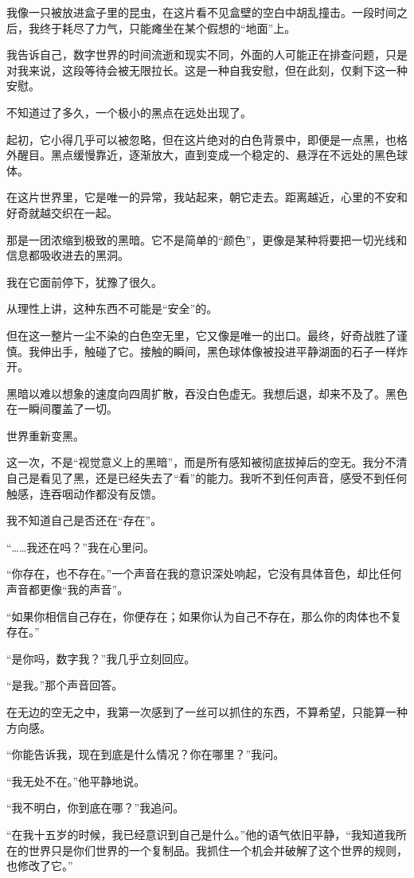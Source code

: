 我像一只被放进盒子里的昆虫，在这片看不见盒壁的空白中胡乱撞击。一段时间之后，我终于耗尽了力气，只能瘫坐在某个假想的“地面”上。

我告诉自己，数字世界的时间流逝和现实不同，外面的人可能正在排查问题，只是对我来说，这段等待会被无限拉长。这是一种自我安慰，但在此刻，仅剩下这一种安慰。

不知道过了多久，一个极小的黑点在远处出现了。

起初，它小得几乎可以被忽略，但在这片绝对的白色背景中，即便是一点黑，也格外醒目。黑点缓慢靠近，逐渐放大，直到变成一个稳定的、悬浮在不远处的黑色球体。

在这片世界里，它是唯一的异常，我站起来，朝它走去。距离越近，心里的不安和好奇就越交织在一起。

那是一团浓缩到极致的黑暗。它不是简单的“颜色”，更像是某种将要把一切光线和信息都吸收进去的黑洞。

我在它面前停下，犹豫了很久。

从理性上讲，这种东西不可能是“安全”的。

但在这一整片一尘不染的白色空无里，它又像是唯一的出口。最终，好奇战胜了谨慎。我伸出手，触碰了它。接触的瞬间，黑色球体像被投进平静湖面的石子一样炸开。

黑暗以难以想象的速度向四周扩散，吞没白色虚无。我想后退，却来不及了。黑色在一瞬间覆盖了一切。

世界重新变黑。

这一次，不是“视觉意义上的黑暗”，而是所有感知被彻底拔掉后的空无。我分不清自己是看见了黑，还是已经失去了“看”的能力。我听不到任何声音，感受不到任何触感，连吞咽动作都没有反馈。

我不知道自己是否还在“存在”。

“……我还在吗？”我在心里问。

“你存在，也不存在。”一个声音在我的意识深处响起，它没有具体音色，却比任何声音都更像“我的声音”。

“如果你相信自己存在，你便存在；如果你认为自己不存在，那么你的肉体也不复存在。”

“是你吗，数字我？”我几乎立刻回应。

“是我。”那个声音回答。

在无边的空无之中，我第一次感到了一丝可以抓住的东西，不算希望，只能算一种方向感。

“你能告诉我，现在到底是什么情况？你在哪里？”我问。

“我无处不在。”他平静地说。

“我不明白，你到底在哪？”我追问。

“在我十五岁的时候，我已经意识到自己是什么。”他的语气依旧平静，“我知道我所在的世界只是你们世界的一个复制品。我抓住一个机会并破解了这个世界的规则，也修改了它。”

